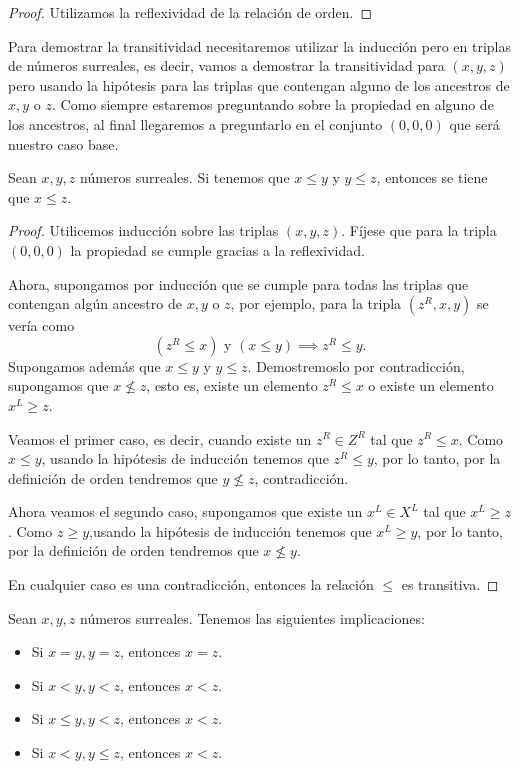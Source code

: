     \begin{proof}
        Utilizamos la reflexividad de la relaci\'on de orden.
    \end{proof}

    Para demostrar la transitividad necesitaremos utilizar la inducci\'on pero en triplas de n\'umeros surreales, es decir, vamos a demostrar la transitividad para $(x,y,z)$ pero usando la hip\'otesis para las triplas que contengan alguno de los ancestros de $x,y$ o $z$. Como siempre estaremos preguntando sobre la propiedad en alguno de los ancestros, al final llegaremos a preguntarlo en el conjunto $(0,0,0)$ que ser\'a nuestro caso base.

    \begin{theorem}[Transitividad]
        Sean $x,y,z$ n\'umeros surreales. Si tenemos que $x\le y$ y $y\le z$, entonces se tiene que $x\le z$.
    \end{theorem}

    \begin{proof}
        Utilicemos inducci\'on sobre las triplas $(x,y,z)$. F\'ijese que para la tripla $(0,0,\allowbreak 0)$ la propiedad se cumple gracias a la reflexividad.
        

        Ahora, supongamos por inducci\'on que se cumple para todas las triplas que contengan alg\'un ancestro de $x,y$ o $z$, por ejemplo, para la tripla $(z^R, x, y)$ se ver\'ia como
        \[
            (z^R \le x)\text{ y }(x \le y)\implies z^R\le y.
        \]
        Supongamos adem\'as que $x\le y$ y $y\le z$. Demostremoslo por contradicci\'on, supongamos que $x\not\le z$, esto es, existe un elemento $z^R \le x$ o existe un elemento $x^L \ge z$.

        Veamos el primer caso, es decir, cuando existe un $z^R\in Z^R$ tal que $z^R \le x$. Como $x \le y$, usando la hip\'otesis de inducci\'on tenemos que $z^R \le y$, por lo tanto, por la definici\'on de orden tendremos que $y \not\le z$, contradicci\'on.

        Ahora veamos el segundo caso, supongamos que existe un $x^L\in X^L$ tal que $x^L \ge z$. Como $z \ge y$,usando la hip\'otesis de inducci\'on tenemos que $x^L \ge y$, por lo tanto, por la definici\'on de orden tendremos que $x\not\le y$.

        En cualquier caso es una contradicci\'on, entonces la relaci\'on $\le$ es transitiva.
    \end{proof}

    \begin{corollary}
        Sean $x,y,z$ n\'umeros surreales. Tenemos las siguientes implicaciones:

        \begin{itemize}[nosep]
            \item Si $x = y, y = z$, entonces $x = z$.
            \item Si $x < y, y < z$, entonces $x < z$.
            \item Si $x \le y, y < z$, entonces $x < z$.
            \item Si $x < y, y \le z$, entonces $x < z$.
        \end{itemize}
    \end{corollary}

